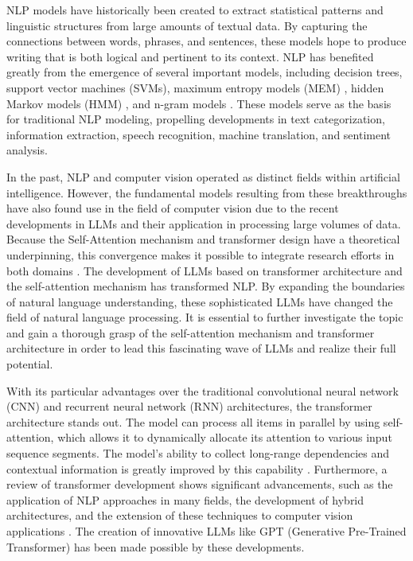 NLP models have historically been created to extract statistical patterns and linguistic structures from large amounts of textual data. By capturing the connections between words, phrases, and sentences, these models hope to produce writing that is both logical and pertinent to its context. NLP has benefited greatly from the emergence of several important models, including decision trees, support vector machines (SVMs), maximum entropy models (MEM) \cite{berger1996}, hidden Markov models (HMM) \cite{rabiner1989}, and n-gram models \cite{jelinek1980}. These models serve as the basis for traditional NLP modeling, propelling developments in text categorization, information extraction, speech recognition, machine translation, and sentiment analysis.

In the past, NLP and computer vision operated as distinct fields within artificial intelligence. However, the fundamental models resulting from these breakthroughs have also found use in the field of computer vision due to the recent developments in LLMs and their application in processing large volumes of data. Because the Self-Attention mechanism and transformer design have a theoretical underpinning, this convergence makes it possible to integrate research efforts in both domains \cite{Vaswani2017}. The development of LLMs based on transformer architecture and the self-attention mechanism has transformed NLP. By expanding the boundaries of natural language understanding, these sophisticated LLMs have changed the field of natural language processing. It is essential to further investigate the topic and gain a thorough grasp of the self-attention mechanism and transformer architecture in order to lead this fascinating wave of LLMs and realize their full potential.

With its particular advantages over the traditional convolutional neural network (CNN) and recurrent neural network (RNN) architectures, the transformer architecture stands out. The model can process all items in parallel by using self-attention, which allows it to dynamically allocate its attention to various input sequence segments. The model's ability to collect long-range dependencies and contextual information is greatly improved by this capability \cite{Vaswani2017}. Furthermore, a review of transformer development shows significant advancements, such as the application of NLP approaches in many fields, the development of hybrid architectures, and the extension of these techniques to computer vision applications \cite{dosovitskiy2020} . The creation of innovative LLMs like GPT \cite{radford2019} (Generative Pre-Trained Transformer) has been made possible by these developments.

